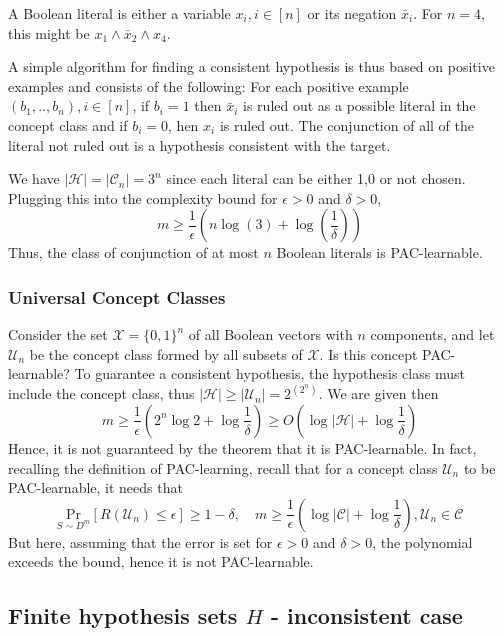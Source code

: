 A Boolean literal is either a variable $x_{i}, i\in [n]$ or its negation $\bar{x}_{i}$. For $n=4$, this might be $x_{1}\land  \bar{x}_{2}\land x_{4}$. 

A simple algorithm for finding a consistent hypothesis is thus based on positive examples and consists of the following: For each positive example $(b_{1},..,b_{n}),i\in [n]$, if $b_{i}=1$ then $\bar{x}_{i}$ is ruled out as a possible literal in the concept class and if $b_{i}=0$, hen $x_{i}$ is ruled out. The conjunction of all of the literal not ruled out is a hypothesis consistent with the target. 

We have $\lvert \mathcal{H} \rvert=\lvert \mathcal{C}_{n} \rvert=3^{n}$ since each literal can be either 1,0 or not chosen. Plugging this into the complexity bound for $\epsilon>0$ and $\delta>0$, $$m\geq \frac{1}{\epsilon}\left( n\log{(3)+\log{\left( \frac{1}{\delta} \right)}} \right)$$
Thus, the class of conjunction of at most $n$ Boolean literals is PAC-learnable. 
\subsubsection{Universal Concept Classes}
Consider the set $\mathcal{X}=\{ 0,1 \}^{n}$ of all Boolean vectors with $n$ components, and let $\mathcal{U}_{n}$ be the concept class formed by all subsets of $\mathcal{X}$. Is this concept PAC-learnable? To guarantee a consistent hypothesis, the hypothesis class must include the concept class, thus $\lvert \mathcal{H} \rvert\geq \lvert \mathcal{U}_{n} \rvert=2^{(2^{n})}$. We are given then $$m\geq \frac{1}{\epsilon}\left( 2^{n}\log{2}+\log{\frac{1}{\delta}} \right)\geq O\left( \log{\lvert \mathcal{H} \rvert +\log{\frac{1}{\delta}}} \right)$$
Hence, it is not guaranteed by the theorem that it is PAC-learnable. In fact, recalling the definition of PAC-learning, recall that for a concept class $\mathcal{U}_{n}$ to be PAC-learnable, it needs that $$\underset{S\sim D^{m}}{\mathrm{Pr}}[R(\mathcal{U}_{n})\leq \epsilon]\geq 1-\delta,\quad m \geq \frac{1}{\epsilon} \left( \log{\lvert \mathcal{C} \rvert }+\log{\frac{1}{\delta}} \right),\mathcal{U}_{n}\in\mathcal{C}$$
But here, assuming that the error is set for $\epsilon>0$ and $\delta>0$, the polynomial exceeds the bound, hence it is not PAC-learnable. 

\subsection{Finite hypothesis sets $H$ - inconsistent case}

